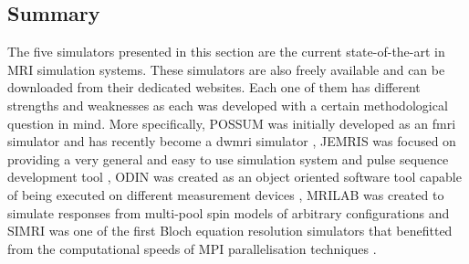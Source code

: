 

    
    
    



\hfill

\subsection{Summary}
The five simulators presented in this section are the current state-of-the-art in MRI simulation systems.
These simulators are also freely available and can be downloaded from their dedicated websites.
Each one of them has different strengths and weaknesses as each was developed with a certain methodological question in mind.
More specifically, POSSUM was initially developed as an \ac{fmri} simulator \cite{Drobnjak2006} and has recently become a \ac{dwmri} simulator \cite{Graham2016}, 
JEMRIS was focused on providing a very general and easy to use simulation system and pulse sequence development tool \cite{Stocker2010}, 
ODIN was created as an object oriented software tool capable of being executed on different measurement devices \cite{Jochimsen2004},
MRILAB was created to simulate responses from multi-pool spin models of arbitrary configurations \cite{Liu2017}
and
SIMRI was one of the first Bloch equation resolution simulators that benefitted from the computational speeds of MPI parallelisation techniques \cite{Benoit-Cattin2005}.

\hfill

